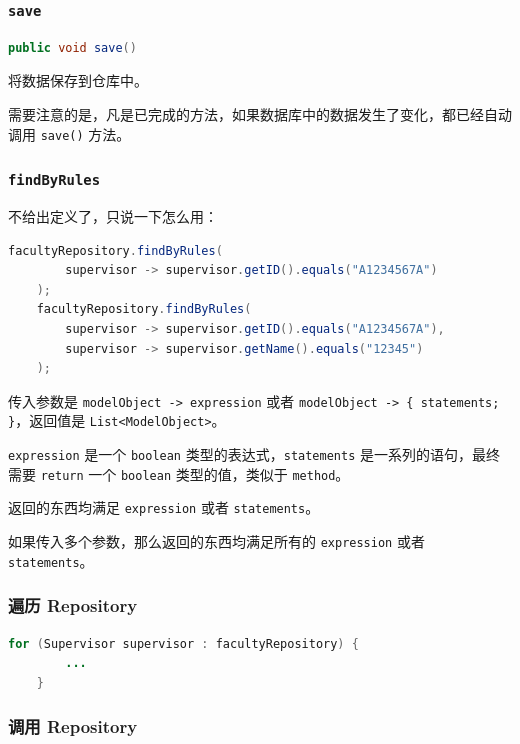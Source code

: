 \documentclass[hyperref,UTF8,12pt,a4paper]{ctexart}
\begin{document}
\subsubsection{\texttt{save}}

\begin{lstlisting}[language=Java]
	public void save()
\end{lstlisting}

将数据保存到仓库中。

需要注意的是，凡是已完成的方法，如果数据库中的数据发生了变化，都已经自动调用 \texttt{save()} 方法。

\subsubsection{\texttt{findByRules}}

不给出定义了，只说一下怎么用：

\begin{lstlisting}[language=Java]
    facultyRepository.findByRules(
		supervisor -> supervisor.getID().equals("A1234567A")
	);
    facultyRepository.findByRules(
		supervisor -> supervisor.getID().equals("A1234567A"),
		supervisor -> supervisor.getName().equals("12345")
	);
\end{lstlisting}

传入参数是 \texttt{modelObject -> expression} 或者 \texttt{modelObject -> \{ statements; \}}，返回值是 \texttt{List<ModelObject>}。

\texttt{expression} 是一个 \texttt{boolean} 类型的表达式，\texttt{statements} 是一系列的语句，最终需要 \texttt{return} 一个 \texttt{boolean} 类型的值，类似于 \texttt{method}。

返回的东西均满足 \texttt{expression} 或者 \texttt{statements}。

如果传入多个参数，那么返回的东西均满足所有的 \texttt{expression} 或者 \texttt{statements}。

\subsubsection{遍历 Repository}

\begin{lstlisting}[language=Java]
	for (Supervisor supervisor : facultyRepository) {
		...
	}
\end{lstlisting}

\subsubsection{调用 Repository}
\end{document}
